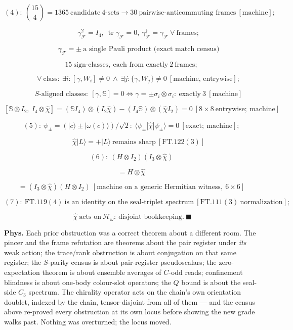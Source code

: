\documentclass[11pt,openany]{report}
\theoremstyle{canonplain}
\theoremstyle{canondef}
\begin{document}
\[
(4):\ \binom{15}4=1365\ \text{candidate}\ 4\text{-sets}\to30\ \text{pairwise-anticommuting frames}\ [\text{machine}];
\]

\[
\qquad \gamma_{\mathcal F}^2=I_4,\ \operatorname{tr}\gamma_{\mathcal F}=0,\ \gamma_{\mathcal F}^\dagger=\gamma_{\mathcal F}\ \forall\ \text{frames};
\]

\[
\qquad \gamma_{\mathcal F}=\pm\ \text{a single Pauli product (exact match census)}
\]

\[
15\ \text{sign-classes},\ \text{each from exactly}\ 2\ \text{frames};
\]

\[
\qquad \forall\ \text{class}:\ \exists i:[\gamma,W_i]\ne0\ \wedge\ \exists j:\{\gamma,W_j\}\ne0\ [\text{machine, entrywise}];
\]

\[
\qquad S\text{-aligned classes}:\ [\gamma,\mathbb S]=0\iff\gamma=\pm\sigma_i\otimes\sigma_i:\ \text{exactly}\ 3\ [\text{machine}]
\]

\[
[\mathbb S\otimes I_2,\ I_4\otimes\hat\chi]=(\mathbb S I_4)\otimes(I_2\hat\chi)-(I_4\mathbb S)\otimes(\hat\chi I_2)=0\ [8\times8\ \text{entrywise};\ \text{machine}]
\]

\[
(5):\ \psi_\pm=(|c\rangle\pm|\omega(c)\rangle)/\sqrt2:\ \langle\psi_\pm|\hat\chi|\psi_\pm\rangle=0\ [\text{exact};\ \text{machine}];
\]

\[
\qquad \hat\chi|L\rangle=+|L\rangle\ \text{remains sharp}\ [\mathrm{FT.122}(3)]
\]

\[
(6):\ (H\otimes I_2)(I_3\otimes\hat\chi)
\]

\[
= H\otimes\hat\chi
\]

\[
= (I_3\otimes\hat\chi)(H\otimes I_2)\ [\text{machine on a generic Hermitian witness},\ 6\times6]
\]

\[
(7):\ \text{FT.119}(4)\ \text{is an identity on the seal-triplet spectrum}\ [\mathrm{FT.111}(3)\ \text{normalization}];
\]

\[
\ \hat\chi\ \text{acts on}\ \mathcal H_\omega:\ \text{disjoint bookkeeping}.\ \blacksquare
\]

\textbf{Phys.} Each prior obstruction was a correct theorem about a different room. The pincer and the frame refutation are theorems about the pair register under \textit{its} weak action; the trace/rank obstruction is about conjugation on that same register; the $S$-parity census is about pair-register pseudoscalars; the zero-expectation theorem is about ensemble averages of $C$-odd reads; confinement blindness is about one-body colour-slot operators; the $Q$ bound is about the seal-side $C_3$ spectrum. The chirality operator acts on the chain's own orientation doublet, indexed by the chain, tensor-disjoint from all of them — and the census above re-proved every obstruction at its own locus before showing the new grade walks past. Nothing was overturned; the locus moved.
\end{document}
